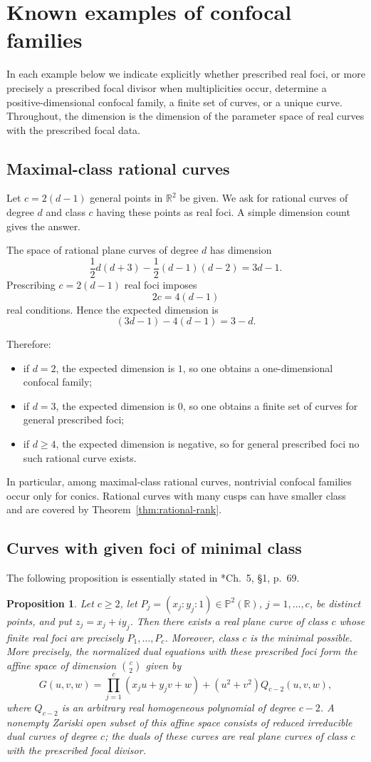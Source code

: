 \documentclass[11pt]{amsart}
\newtheorem{prop}[lemma]{Proposition}
\theoremstyle{definition}
\theoremstyle{remark}
\newcommand{\bR}{\mathbb{R}}
\newcommand{\bP}{\mathbb{P}}
\begin{document}
\section{Known examples of confocal families}
In each example below we indicate explicitly whether prescribed real foci, or more precisely a prescribed focal divisor when multiplicities occur, determine a positive-dimensional confocal family, a finite set of curves, or a unique curve. Throughout, the dimension is the dimension of the parameter space of real curves with the prescribed focal data.

\subsection{Maximal-class rational curves} 
Let $c=2(d-1)$ general points in $\mathbb R^2$ be given. We ask for rational curves of
degree $d$ and class $c$ having these points as real foci. A simple dimension count gives
the answer.

The space of rational plane curves of degree $d$ has dimension
\[
\frac12 d(d+3)-\frac12 (d-1)(d-2)=3d-1.
\]
Prescribing $c=2(d-1)$ real foci imposes
\[
2c=4(d-1)
\]
real conditions. Hence the expected dimension is
\[
(3d-1)-4(d-1)=3-d.
\]

Therefore:
\begin{itemize}
\item if $d=2$, the expected dimension is $1$, so one obtains a one-dimensional confocal family;
\item if $d=3$, the expected dimension is $0$, so one obtains a finite set of curves for general prescribed foci;
\item if $d\ge 4$, the expected dimension is negative, so for general prescribed foci no such rational curve exists.
\end{itemize}
In particular, among maximal-class rational curves, nontrivial confocal families occur only for conics. Rational curves with many cusps can have smaller class and are covered by Theorem~\ref{thm:rational-rank}.

\subsection{Curves with given foci of minimal class}
The following proposition is essentially stated in \cite{Hi}*{Ch.~5, §1, p.~69}.

\begin{prop}
Let $c\ge 2$, let $P_j=(x_j:y_j:1)\in \bP^2(\bR)$, $j=1,\dots,c$, be distinct points, and put $z_j=x_j+iy_j$. Then there exists a real plane curve of class $c$ whose finite real foci are precisely $P_1,\dots,P_c$. Moreover, class $c$ is the minimal possible. More precisely, the normalized dual equations with these prescribed foci form the affine space of dimension $\binom{c}{2}$ given by
\[
G(u,v,w)=\prod_{j=1}^c (x_ju+y_jv+w)+(u^2+v^2)Q_{c-2}(u,v,w),
\]
where $Q_{c-2}$ is an arbitrary real homogeneous polynomial of degree $c-2$. A nonempty Zariski open subset of this affine space consists of reduced irreducible dual curves of degree $c$; the duals of these curves are real plane curves of class $c$ with the prescribed focal divisor.
\end{prop}
\end{document}
